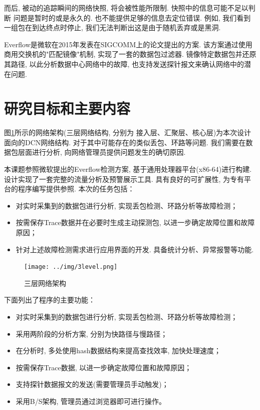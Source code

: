 而后, 被动的追踪瞬间的网络快照, 将会被性能所限制. 快照中的信息可能不足以判断
问题是暂时的或是永久的. 也不能提供足够的信息去定位错误.
例如, 我们看到一组包在到达终点时停止,
我们无法判断出这是由于随机丢弃或是黑洞.

Everflow是微软在2015年发表在SIGCOMM上的论文提出的方案. 该方案通过使用
商用交换机的"匹配镜像"机制, 实现了一套的数据包过滤器.
镜像特定数据包并还原其路径, 以此分析数据中心网络中的故障,
也支持发送探针报文来确认网络中的潜在问题.

\section{研究目标和主要内容}

  图\ref{fig:3level}所示的网络架构(三层网络结构, 分别为
接入层、汇聚层、核心层)为本次设计面向的DCN网络结构.
对于其中可能存在的类似丢包、环路等问题. 我们需要在数据包层面进行分析,
向网络管理员提供问题发生的确切原因.

  本课题参照微软提出的Everflow检测方案, 基于通用处理器平台(x86-64)进行构建.
设计实现了一套完整的流量分析及预警展示工具.
具有良好的可扩展性, 为专有平台的程序编写提供参照. 本次的任务包括：

\begin{itemize}
  \item 对实时采集到的数据包进行分析, 实现丢包检测、环路分析等故障检测；
  \item 按需保存Trace数据并在必要时生成主动探测包, 以进一步确定故障位置和故障原因；
  \item 针对上述故障检测需求进行应用界面的开发. 具备统计分析、异常报警等功能.
\end{itemize}

\begin{figure}[htbp!]
  \centering
  \texttt{[image: ../img/3level.png]}
  \caption{三层网络架构}
  \label{fig:3level}
\end{figure}


下面列出了程序的主要功能：
\begin{itemize}
  \item
    对实时采集到的数据包进行分析, 实现丢包检测、环路分析等故障检测；
  \item
    采用两阶段的分析方案, 分别为快路径与慢路径；
  \item
    在分析时, 多处使用hash数据结构来提高查找效率, 加快处理速度；
  \item
    按需保存Trace数据, 以进一步确定故障位置和故障原因；
  \item
    支持探针数据报文的发送(需要管理员手动触发)；
  \item
    采用B/S架构, 管理员通过浏览器即可进行操作。
\end{itemize}

